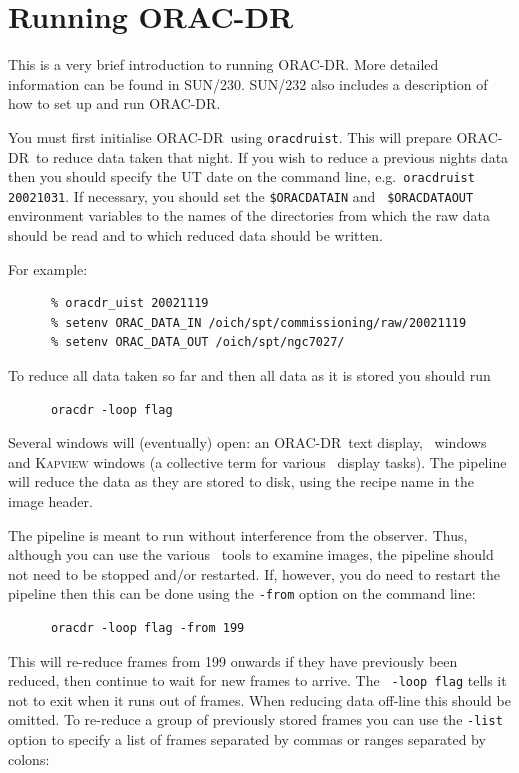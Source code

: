 \documentclass[twoside,11pt]{article}
\newcommand{\xref}[3]{#1}
\renewcommand{\_}{\texttt{\symbol{95}}}
\newcommand{\GAIA}{\xref{{\sc{Gaia}}}{sun214}{}}
\newcommand{\KAPPA}{\xref{{\sc{Kappa}}}{sun95}{}}
\newcommand{\ORACDR}{{\footnotesize ORAC-DR}}
\begin{document}
\section{Running ORAC-DR}

This is a very brief introduction to running \ORACDR. More detailed
information can be found in \xref{SUN/230}{sun230}{}.
\xref{SUN/232}{sun232}{} also includes a description of how to set up
and run \ORACDR.

You must first initialise \ORACDR\ using {\tt oracdr\_uist}. This will
prepare \ORACDR\ to reduce data taken that night. If
you wish to reduce a previous nights data then you should specify the
UT date on the command line, e.g.\ {\tt oracdr\_uist 20021031}. If
necessary, you should set the {\tt \$ORAC\_DATA\_IN} and {\tt
  \$ORAC\_DATA\_OUT} environment variables to the names of the
directories from which the raw data should be read and to which reduced
data should be written.

For example:

\begin{verbatim}
      % oracdr_uist 20021119
      % setenv ORAC_DATA_IN /oich/spt/commissioning/raw/20021119
      % setenv ORAC_DATA_OUT /oich/spt/ngc7027/
\end{verbatim}


To reduce all data taken so far and then all data as it is stored you
should run

\begin{verbatim}
      oracdr -loop flag
\end{verbatim}

Several windows will (eventually) open: an \ORACDR\ text display, \GAIA\
windows and \textsc{Kapview} windows (a collective term for various
\KAPPA\ display tasks). The pipeline will reduce the data as they
are stored to disk, using the recipe name in the image header.

The pipeline is meant to run without interference from the observer.
Thus, although you can use the various \GAIA\ tools to examine images,
the pipeline should not need to be stopped and/or restarted. If,
however, you do need to restart the pipeline then this can be done
using the {\tt -from} option on the command line:

\begin{verbatim}
      oracdr -loop flag -from 199
\end{verbatim}

This will re-reduce frames from 199 onwards if they have previously
been reduced, then continue to wait for new frames to arrive. The {\tt
  -loop flag} tells it not to exit when it runs out of frames. When
reducing data off-line this should be omitted. To re-reduce a group of
previously stored frames you can use the {\tt -list} option to specify
a list of frames separated by commas or ranges separated by colons:
\end{document}
